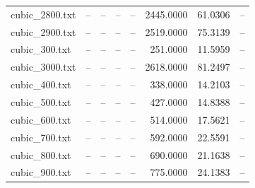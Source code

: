\begin{table}[h!]
\begin{tabular}{lrrrrrrr}
cubic_2800.txt & -- & -- & -- & -- & 2445.0000 & 61.0306 & -- \\
cubic_2900.txt & -- & -- & -- & -- & 2519.0000 & 75.3139 & -- \\
cubic_300.txt & -- & -- & -- & -- & 251.0000 & 11.5959 & -- \\
cubic_3000.txt & -- & -- & -- & -- & 2618.0000 & 81.2497 & -- \\
cubic_400.txt & -- & -- & -- & -- & 338.0000 & 14.2103 & -- \\
cubic_500.txt & -- & -- & -- & -- & 427.0000 & 14.8388 & -- \\
cubic_600.txt & -- & -- & -- & -- & 514.0000 & 17.5621 & -- \\
cubic_700.txt & -- & -- & -- & -- & 592.0000 & 22.5591 & -- \\
cubic_800.txt & -- & -- & -- & -- & 690.0000 & 21.1638 & -- \\
cubic_900.txt & -- & -- & -- & -- & 775.0000 & 24.1383 & -- \\
\hline
\end{tabular}
\end{table}
